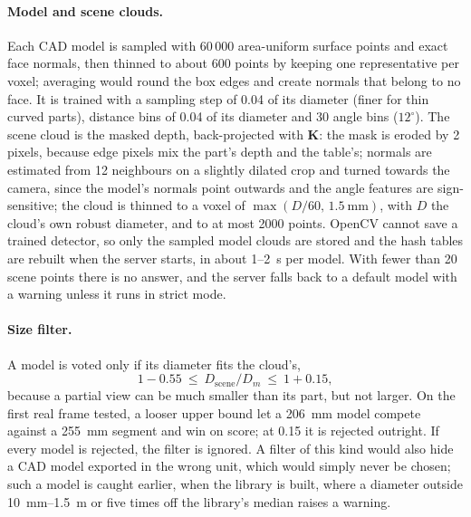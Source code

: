 \paragraph{Model and scene clouds.} Each CAD model is sampled with 60\,000 area-uniform surface
points and exact face normals, then thinned to about 600 points by keeping one representative per
voxel; averaging would round the box edges and create normals that belong to no face. It is trained
with a sampling step of 0.04 of its diameter (finer for thin curved parts), distance bins of 0.04
of its diameter and 30 angle bins ($12^\circ$). The scene cloud is the masked depth, back-projected
with $\mathbf{K}$: the mask is eroded by 2 pixels, because edge pixels mix the part's depth and the
table's; normals are estimated from 12 neighbours on a slightly dilated crop and turned towards the
camera, since the model's normals point outwards and the angle features are sign-sensitive; the
cloud is thinned to a voxel of $\max(D/60,\,1.5~\mathrm{mm})$, with $D$ the cloud's own robust
diameter, and to at most 2000 points. OpenCV cannot save a trained detector, so only the sampled
model clouds are stored and the hash tables are rebuilt when the server starts, in about 1--2~s per
model. With fewer than 20 scene points there is no answer, and the server falls back to a default
model with a warning unless it runs in strict mode.

\paragraph{Size filter.} A model is voted only if its diameter fits the cloud's,
\begin{equation}
1-0.55\ \le\ D_{\mathrm{scene}}/D_m\ \le\ 1+0.15,
\label{eq:ppf_extent}
\end{equation}
because a partial view can be much smaller than its part, but not larger. On the first real frame
tested, a looser upper bound let a 206~mm model compete against a 255~mm segment and win on score;
at 0.15 it is rejected outright. If every model is rejected, the filter is ignored. A filter of this
kind would also hide a CAD model exported in the wrong unit, which would simply never be chosen;
such a model is caught earlier, when the library is built, where a diameter outside 10~mm--1.5~m or
five times off the library's median raises a warning.

